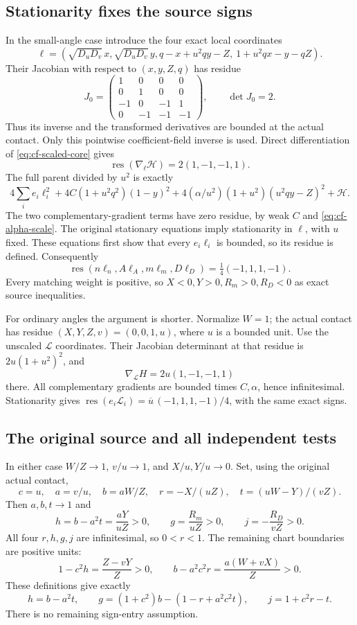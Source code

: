 \subsection{Stationarity fixes the source signs}
In the small-angle case introduce the four exact local coordinates
\[
\ell=\left(\sqrt{D_uD_v}\,x,\sqrt{D_uD_v}\,y,
 q-x+u^2qy-Z,\ 1+u^2qx-y-qZ\right).
\]
Their Jacobian with respect to \((x,y,Z,q)\) has residue
\[
J_0=\begin{pmatrix}
1&0&0&0\\0&1&0&0\\-1&0&-1&1\\0&-1&-1&-1
\end{pmatrix},\qquad \det J_0=2.
\]
Thus its inverse and the transformed derivatives are bounded at the
actual contact. Only this pointwise coefficient-field inverse is used.
Direct differentiation of \eqref{eq:cf-scaled-core} gives
\[
\operatorname{res}(\nabla_\ell\mathcal H)=2(1,-1,-1,1).
\]
The full parent divided by \(u^2\) is exactly
\[
4\sum_i e_i\ell_i^2
 +4C(1+u^2q^2)(1-y)^2
 +4(\alpha/u^2)(1+u^2)(u^2qy-Z)^2+\mathcal H.
\]
The two complementary-gradient terms have zero residue, by weak \(C\)
and \eqref{eq:cf-alpha-scale}. The original stationary equations imply
stationarity in \(\ell\), with \(u\) fixed. These equations first show
that every \(e_i\ell_i\) is bounded, so its residue is defined. Consequently
\begin{equation}
\operatorname{res}(n\ell_n,A\ell_A,m\ell_m,D\ell_D)
                         =\tfrac14(-1,1,1,-1).        \label{eq:cf-sign-residue}
\end{equation}
Every matching weight is positive, so \(X<0,Y>0,R_m>0,R_D<0\)
as exact source inequalities.

For ordinary angles the argument is shorter. Normalize \(W=1\);
the actual contact has residue
\((X,Y,Z,v)=(0,0,1,u)\), where \(u\) is a bounded unit.
Use the unscaled \(\mathcal L\) coordinates. Their Jacobian determinant
at that residue is \(2u(1+u^2)^2\), and
\[
\nabla_{\mathcal L}H=2u(1,-1,-1,1)
\]
there. All complementary gradients are bounded times \(C,\alpha\),
hence infinitesimal. Stationarity gives
\(\operatorname{res}(e_i\mathcal L_i)
 =\overline u\,(-1,1,1,-1)/4\), with the same exact signs.

\subsection{The original source and all independent tests}
In either case \(W/Z\to1\), \(v/u\to1\), and \(X/u,Y/u\to0\).
Set, using the original actual contact,
\[
c=u,\quad a=v/u,\quad b=aW/Z,\quad
r=-X/(uZ),\quad t=(uW-Y)/(vZ).
\]
Then \(a,b,t\to1\) and
\[
h=b-a^2t=\frac{aY}{uZ}>0,\qquad
g=\frac{R_m}{uZ}>0,\qquad j=-\frac{R_D}{vZ}>0.
\]
All four \(r,h,g,j\) are infinitesimal, so \(0<r<1\).
The remaining chart boundaries are positive units:
\[
1-c^2h=\frac{Z-vY}{Z}>0,\qquad
b-a^2c^2r=\frac{a(W+vX)}Z>0.
\]
These definitions give exactly
\[
h=b-a^2t,\qquad
g=(1+c^2)b-(1-r+a^2c^2t),\qquad j=1+c^2r-t.
\]
There is no remaining sign-entry assumption.

